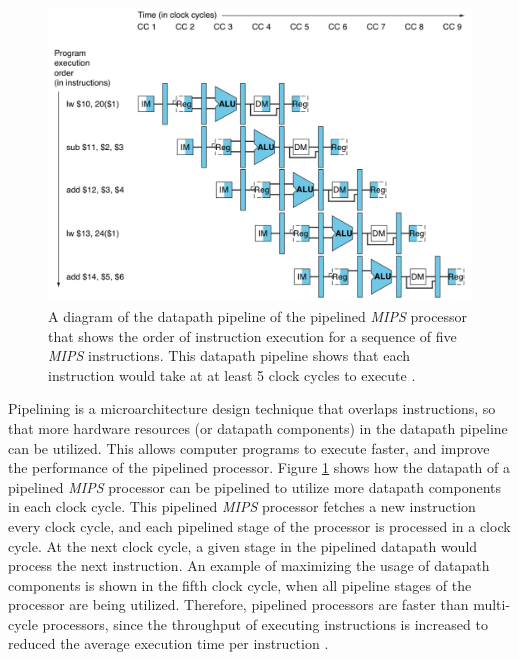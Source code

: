 \begin{figure}[h]
\centering 
\includegraphics[width=6in]{./pics/pipelined-processor-pipelining}
\caption{A diagram of the datapath pipeline of the pipelined {\it MIPS} processor that shows the order of instruction execution for a sequence of five {\it MIPS} instructions. This datapath pipeline shows that each instruction would take at at least 5 clock cycles to execute \cite{Patterson2012}.}
\label{fig:pipelinedprocessorpipelining}
\end{figure}

Pipelining is a microarchitecture design technique that overlaps instructions, so that more hardware resources (or datapath components) in the datapath pipeline can be utilized. This allows computer programs to execute faster, and improve the performance of the pipelined processor. Figure \ref{fig:pipelinedprocessorpipelining} shows how the datapath of a pipelined {\it MIPS} processor can be pipelined to utilize more datapath components in each clock cycle. This pipelined {\it MIPS} processor fetches a new instruction every clock cycle, and each pipelined stage of the processor is processed in a clock cycle. At the next clock cycle, a given stage in the pipelined datapath would process the next instruction. An example of maximizing the usage of datapath components is shown in the fifth clock cycle, when all pipeline stages of the processor are being utilized. Therefore, pipelined processors are faster than multi-cycle processors, since the throughput of executing instructions is increased \cite{Patterson2012} to reduced the average execution time per instruction \cite{Hennessy2012}. \\

